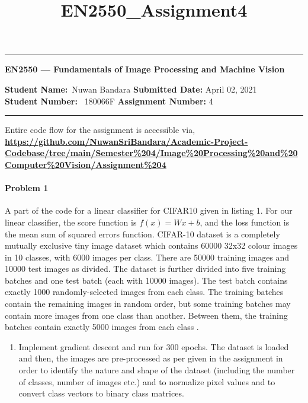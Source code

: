 \documentclass[11pt]{scrartcl}
\title{EN2550_Assignment4}
\begin{document}
\begin{center}
	\hrule
	\vspace{.4cm}
	{\textbf { \large EN2550 --- Fundamentals of Image Processing and Machine Vision}}
\end{center}
{\textbf{Student Name:}\ Nuwan Bandara \hspace{\fill} \textbf{Submitted Date:} April 02, 2021   \\
{ \textbf{Student Number:}} \ 180066F \hspace{\fill} \textbf{Assignment Number:} 4 \\
	\hrule

\bigskip

Entire code flow for the assignment is accessible via, \\ 
\textbf{\url{https://github.com/NuwanSriBandara/Academic-Project-Codebase/tree/main/Semester\%204/Image\%20Processing\%20and\%20Computer\%20Vision/Assignment\%204}}

\paragraph*{Problem 1} %
A part of the code for a linear classifier for CIFAR10 given in listing 1. For our linear classifier, the score function is $f(x) = Wx + b$, and the loss function is the mean sum of squared errors function.
\newline
CIFAR-10 dataset is a completely mutually exclusive tiny image dataset which contains 60000 32x32 colour images in 10 classes, with 6000 images per class. There are 50000 training images and 10000 test images as divided. The dataset is further divided into five training batches and one test batch (each with 10000 images). The test batch contains exactly 1000 randomly-selected images from each class. The training batches contain the remaining images in random order, but some training batches may contain more images from one class than another. Between them, the training batches contain exactly 5000 images from each class \cite{A1}.
\begin{enumerate}[label=(\alph*)]
\item Implement gradient descent and run for 300 epochs.
\newline The dataset is loaded and then, the images are pre-processed as per given in the assignment in order to identify the nature and shape of the dataset (including the number of classes, number of images etc.) and to normalize pixel values and to convert class vectors to binary class matrices.


\end{enumerate}}
\end{document}
